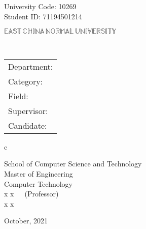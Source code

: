 \newpage

\pagestyle{empty}

\newline
\hspace*{\fill} {University Code: 10269}\\
\hspace*{\fill} {Student ID: 
71194501214
}%

\vskip 2cm

\begin{center}
    {\Huge $\mathbb{EAST}\,\mathbb{CHINA}\,\mathbb{NORMAL}\,
            \mathbb{UNIVERSITY}$}
\end{center}

\vskip 3cm

\begin{center}
    \bfseries{\scshape{\huge \thesisETitle}}\\
\end{center}

\vskip 2cm {\large
        \begin{center}
            \begin{tabular}{l}
                Department:         \\
                Category:              \\
                Field: \\
                Supervisor:         \\
                Candidate:
            \end{tabular}
            \begin{tabular}c

                School of Computer Science and Technology\\
                \hline Master of Engineering\\
                \hline Computer Technology\\
                \hline x x~~~(Professor)\\
                \hline x x\\


                \hline
            \end{tabular}
        \end{center}}

\vskip 30mm

\begin{center}
    {\Large October, 2021}
\end{center}
